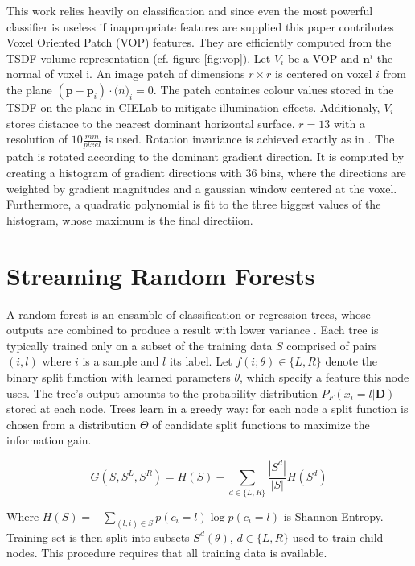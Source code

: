 \documentclass{llncs}
\begin{document}
  This work relies heavily on classification and since even the most powerful classifier is useless if inappropriate features are supplied this paper contributes Voxel Oriented Patch (VOP) features. They are efficiently computed from the TSDF volume representation (cf. figure \ref{fig:vop}). Let $V_i$ be a VOP and $\mathbf{n}^i$ the normal of voxel i. An image patch of dimensions $r \times r$  is centered on voxel $i$ from the plane $(\mathbf{p} - \mathbf{p}_i) \cdot \mathbf(n)_i = 0$. The patch containes colour values stored in the TSDF on the plane in CIELab to mitigate illumination effects. Additionaly, $V_i$ stores distance to the nearest dominant horizontal surface. $r = 13$ with a resolution of $10\frac{mm}{pixel}$ is used. Rotation invariance is achieved exactly as in \cite{sift}. The patch is rotated according to the dominant gradient direction. It is computed by creating a histogram of gradient directions with 36 bins, where the directions are weighted by gradient magnitudes and a gaussian window centered at the voxel. Furthermore, a quadratic polynomial is fit to the three biggest values of the histogram, whose maximum is the final directiion. 

\section{Streaming Random Forests}
  
  A random forest is an ensamble of classification or regression trees, whose outputs are combined to produce a result with lower variance \cite{online_forest}. Each tree is typically trained only on a subset of the training data $S$ comprised of pairs $(i, l)$ where $i$ is a sample and $l$ its label.  Let $f(i; \theta) \in \{L, R\}$ denote the binary split function with learned parameters $\theta$, which specify a feature this node uses. The tree's output amounts to the probability distribution $P_F(x_i = l | \mathbf{D})$ stored at each node. Trees learn in a greedy way: for each node a split function is chosen from a distribution $\Theta$ of candidate split functions to maximize the information gain. 
  
  \begin{equation} \label{eq:infogain}
   G(S, S^L, S^R) = H(S) - \sum_{d \in \{L, R\}} \frac{|S^d|}{|S|}H(S^d)
  \end{equation}
  
  Where $H(S) = - \sum_{(l, i) \in S} p(c_i = l) \log{p(c_i = l)}$ is Shannon Entropy. Training set is then split into subsets $S^d(\theta)$, $d \in \{L, R\}$ used to train child nodes. This procedure requires that all training data is available.
  
\end{document}
